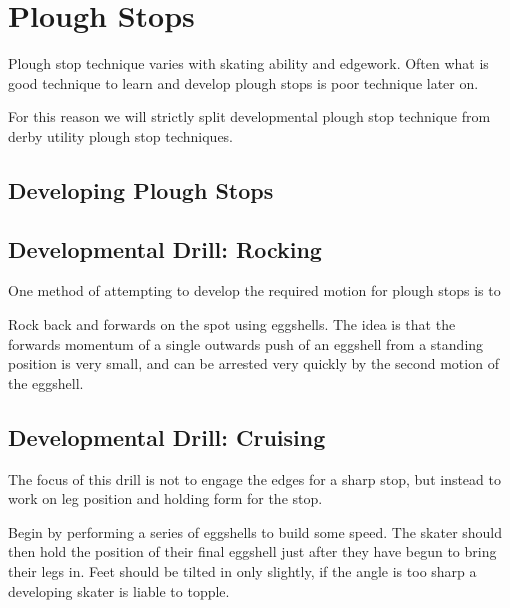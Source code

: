 \section{Plough Stops}
\label{sec:stopping/plough}

Plough stop technique varies with skating ability and edgework.  
Often what is good technique to learn and develop plough stops is poor technique later on.  

For this reason we will strictly split developmental plough stop technique from derby utility plough stop techniques. 


\subsection{Developing Plough Stops}





\subsection{Developmental Drill: Rocking}
\label{drill:stopping/plough/rocking}

One method of attempting to develop the required motion for plough stops is to   

Rock back and forwards on the spot using eggshells. The idea is that the forwards momentum of a single outwards push of an eggshell from a standing position is very small, and can be arrested very quickly by the second motion of the eggshell.  


\subsection{Developmental Drill: Cruising} 
\label{drill:stopping/plough/cruising}


The focus of this drill is not to engage the edges for a sharp stop, but instead to work on leg position and holding form for the stop.  

Begin by performing a series of eggshells to build some speed. 
The skater should then hold the position of their final eggshell just after they have begun to bring their legs in.   
Feet should be tilted in only slightly, if the angle is too sharp a developing skater is liable to topple. 



